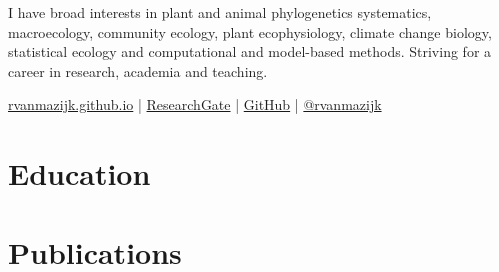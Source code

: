 \documentclass[10pt]{article}
\begin{document}


\bigskip

I have broad interests in plant and animal phylogenetics systematics, 
macroecology, community ecology, plant ecophysiology, climate change biology, 
statistical ecology and computational and model-based methods. Striving for a 
career in research, academia and teaching.

\bigskip




\href{https://rvanmazijk.github.io/}{rvanmazijk.github.io} |
  \href{https://www.researchgate.net/profile/Ruan_Van_Mazijk/}{ResearchGate} |
  \href{https://github.com/rvanmazijk/}{GitHub} |
  \href{https://twitter.com/rvanmazijk/}{@rvanmazijk}






\hrulefill

\section*{Education} %




\bigskip

\section*{Publications} %
\end{document}
